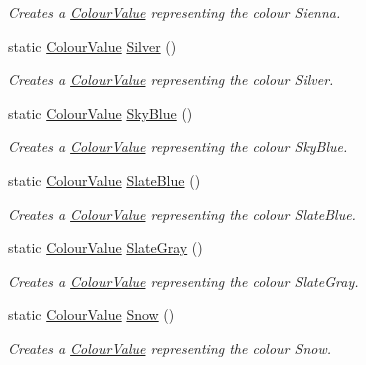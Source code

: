 \begin{DoxyCompactItemize}
\begin{DoxyCompactList}\small\item\em Creates a \hyperlink{classMezzanine_1_1ColourValue}{ColourValue} representing the colour Sienna. \item\end{DoxyCompactList}\item 
static \hyperlink{classMezzanine_1_1ColourValue}{ColourValue} \hyperlink{classMezzanine_1_1ColourValue_af06b9d8fe55e07b0be629b685af223d5}{Silver} ()
\begin{DoxyCompactList}\small\item\em Creates a \hyperlink{classMezzanine_1_1ColourValue}{ColourValue} representing the colour Silver. \item\end{DoxyCompactList}\item 
static \hyperlink{classMezzanine_1_1ColourValue}{ColourValue} \hyperlink{classMezzanine_1_1ColourValue_aa6ffbabd8e54ba5ce0647ae7c21524d5}{SkyBlue} ()
\begin{DoxyCompactList}\small\item\em Creates a \hyperlink{classMezzanine_1_1ColourValue}{ColourValue} representing the colour SkyBlue. \item\end{DoxyCompactList}\item 
static \hyperlink{classMezzanine_1_1ColourValue}{ColourValue} \hyperlink{classMezzanine_1_1ColourValue_a23ce9062156dfb3000d07adfc376549f}{SlateBlue} ()
\begin{DoxyCompactList}\small\item\em Creates a \hyperlink{classMezzanine_1_1ColourValue}{ColourValue} representing the colour SlateBlue. \item\end{DoxyCompactList}\item 
static \hyperlink{classMezzanine_1_1ColourValue}{ColourValue} \hyperlink{classMezzanine_1_1ColourValue_a85d19746b6c8ab0deb66ba9d32dbb6c9}{SlateGray} ()
\begin{DoxyCompactList}\small\item\em Creates a \hyperlink{classMezzanine_1_1ColourValue}{ColourValue} representing the colour SlateGray. \item\end{DoxyCompactList}\item 
static \hyperlink{classMezzanine_1_1ColourValue}{ColourValue} \hyperlink{classMezzanine_1_1ColourValue_a9d1246e3640f2f3dc5ade74c62463d36}{Snow} ()
\begin{DoxyCompactList}\small\item\em Creates a \hyperlink{classMezzanine_1_1ColourValue}{ColourValue} representing the colour Snow. \item\end{DoxyCompactList}\item 

\end{DoxyCompactItemize}

